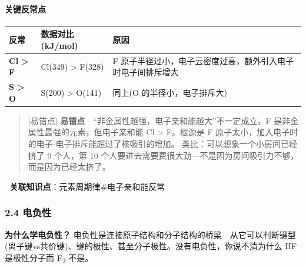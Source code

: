 \paragraph{关键反常点}\label{ux5173ux952eux53cdux5e38ux70b9-1}

{\def\LTcaptype{none} %
\begin{longtable}[]{@{}
  >{\raggedright\arraybackslash}p{}
  >{\raggedright\arraybackslash}p{}
  >{\raggedright\arraybackslash}p{}@{}}
\toprule\noalign{}
\begin{minipage}[b]{\linewidth}\raggedright
反常
\end{minipage} & \begin{minipage}[b]{\linewidth}\raggedright
数据对比 (kJ/mol)
\end{minipage} & \begin{minipage}[b]{\linewidth}\raggedright
原因
\end{minipage} \\
\midrule\noalign{}
\endhead
\bottomrule\noalign{}
\endlastfoot
\textbf{Cl \textgreater{} F} & Cl(349) \textgreater{} F(328) & F 原子半径过小，电子云密度过高，额外引入电子时电子间排斥增大 \\
\textbf{S \textgreater{} O} & S(200) \textgreater{} O(141) & 同上(O 的半径小，电子排斥大) \\
\end{longtable}
}

\begin{quote}
{[}易错点{]} \textbf{易错点}---``非金属性越强，电子亲和能越大''不一定成立。F 是非金属性最强的元素，但电子亲和能 Cl \textgreater{} F。根源是 F 原子太小，加入电子时的电子-电子排斥能超过了核吸引的增加。
类比：可以想象一个小房间已经挤了 9 个人，第 10 个人要进去需要费很大劲---不是因为房间吸引力不够，而是因为已经太挤了。
\end{quote}

🔗 \textbf{关联知识点}：元素周期律\#电子亲和能反常

\subsubsection{2.4 电负性}\label{ux7535ux8d1fux6027}

\textbf{为什么学电负性？} 电负性是连接原子结构和分子结构的桥梁---从它可以判断键型(离子键vs共价键)、键的极性、甚至分子极性。没有电负性，你说不清为什么 HF 是极性分子而 F\textsubscript{2} 不是。

